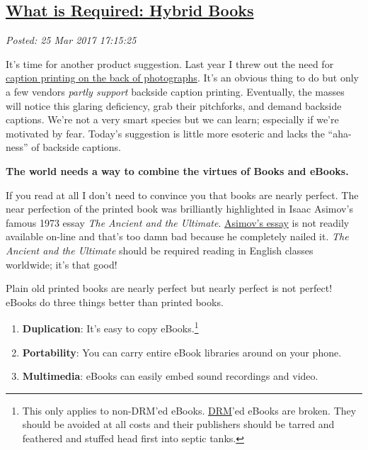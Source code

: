 %

\subsection*{\href{https://analyzethedatanotthedrivel.org/2017/03/25/what-is-required-hybrid-books/}{What is Required: Hybrid Books}}


\noindent\emph{Posted: 25 Mar 2017 17:15:25}
\vspace{6pt}

It's time for another product suggestion. Last year I threw out the need
for
\href{https://analyzethedatanotthedrivel.org/2015/09/07/what-is-required-print-captions-on-the-back-of-photographs/}{caption
printing on the back of photographs}. It's an obvious thing to do but
only a few vendors \emph{partly support} backside caption printing.
Eventually, the masses will notice this glaring deficiency, grab their
pitchforks, and demand backside captions. We're not a very smart species
but we can learn; especially if we're motivated by fear. Today's
suggestion is little more esoteric and lacks the ``aha-ness'' of
backside captions.

\medskip
\textbf{The world needs a way to combine the virtues of Books and
eBooks.}
\medskip

If you read at all I don't need to convince you that books are nearly
perfect. The near perfection of the printed book was brilliantly
highlighted in Isaac Asimov's famous 1973 essay \emph{The Ancient and
the Ultimate}.
\href{https://www.jstor.org/stable/40009789?seq=1\#page_scan_tab_contents}{Asimov's
essay} is not readily available on-line and that's too damn bad because
he completely nailed it. \emph{The Ancient and the Ultimate} should be
required reading in English classes worldwide; it's that good!

Plain old printed books are nearly perfect but nearly perfect is not
perfect! eBooks do three things better than printed books.

\begin{enumerate}
\def\labelenumi{\arabic{enumi}.}
\item
  \textbf{Duplication}: It's easy to copy
  eBooks.\footnote{This only applies to non-DRM'ed eBooks.
  \href{https://en.wikipedia.org/wiki/Digital_rights_management}{DRM}'ed
  eBooks are broken. They should be avoided at all costs and their
  publishers should be tarred and feathered and stuffed head first into
  septic tanks.}\ %
\item
  \textbf{Portability}: You can carry entire eBook libraries around on
  your phone.
\item
  \textbf{Multimedia}: eBooks can easily embed sound recordings and
  video.
\end{enumerate}

